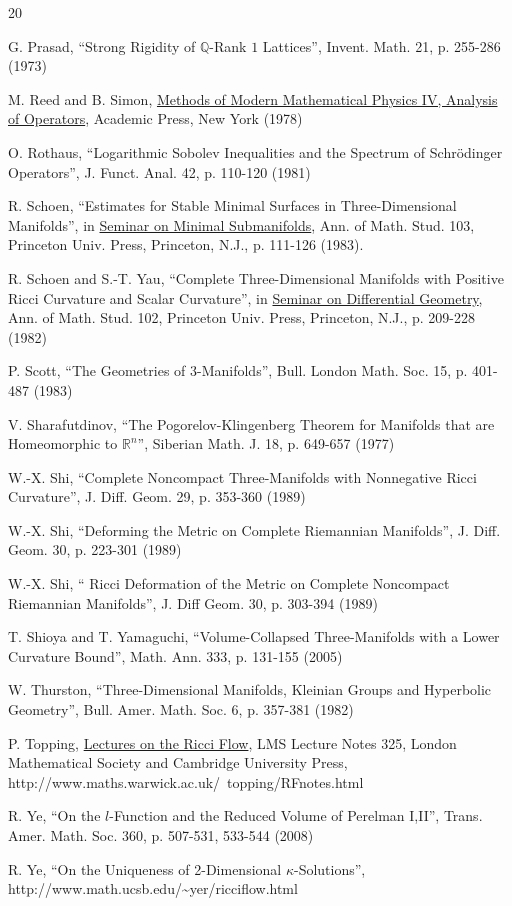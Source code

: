 \documentclass[12pt]{amsart}
\newcommand{\Q}{{\mathbb Q}}
\newcommand{\R}{{\mathbb R}}
\numberwithin{equation}{section}
\theoremstyle{plain}
\theoremstyle{definition}
\theoremstyle{remark}
\begin{document}
\begin{thebibliography}{20}
  
 G. Prasad, ``Strong Rigidity of $\Q$-Rank $1$ Lattices'',
Invent. Math. 21, p. 255-286 (1973)

 M. Reed and B. Simon, 
\underline{Methods of Modern Mathematical Physics IV, Analysis of 
Operators}, Academic Press, New York (1978)

 O. Rothaus,
``Logarithmic Sobolev Inequalities and the Spectrum of Schr\"odinger 
Operators'', J. Funct. Anal. 42, p. 110-120 (1981)

 R. Schoen,
``Estimates for Stable Minimal Surfaces in Three-Dimensional Manifolds'',
in \underline{Seminar on Minimal Submanifolds}, 
Ann. of Math. Stud. 103, Princeton Univ. Press, Princeton, N.J., p. 111-126 (1983).

R. Schoen and S.-T. Yau,
``Complete Three-Dimensional Manifolds with Positive Ricci Curvature
  and Scalar Curvature'', in
\underline{Seminar on Differential Geometry}, Ann. of
  Math. Stud. 102,  Princeton Univ. Press, Princeton, N.J., p.  209-228 (1982)

 P. Scott,
``The Geometries of $3$-Manifolds'',
Bull. London Math. Soc. 15, p. 401-487 (1983) 

 V. Sharafutdinov,
``The Pogorelov-Klingenberg Theorem for Manifolds that are Homeomorphic to 
$\R^n$'',
Siberian Math. J. 18, p. 649-657 (1977)

 W.-X. Shi, ``Complete Noncompact Three-Manifolds
with Nonnegative Ricci Curvature'',
J. Diff. Geom. 29, p. 353-360 (1989)

 W.-X. Shi, ``Deforming the Metric on Complete 
Riemannian Manifolds'',
J. Diff. Geom. 30, p. 223-301 (1989)

 W.-X. Shi, `` Ricci Deformation of the Metric on 
Complete Noncompact Riemannian Manifolds'',
J. Diff Geom. 30, p. 303-394 (1989)

 T. Shioya and T. Yamaguchi,
``Volume-Collapsed Three-Manifolds with a Lower Curvature Bound'',
Math. Ann. 333, p. 131-155 (2005)

 W. Thurston,
``Three-Dimensional Manifolds, Kleinian Groups and Hyperbolic Geometry'',
Bull. Amer. Math. Soc. 6, p. 357-381 (1982)

 P. Topping, \underline{Lectures on the Ricci Flow},
LMS Lecture Notes 325, London Mathematical Society and Cambridge University
Press, 
http://www.maths.warwick.ac.uk/~topping/RFnotes.html
 
 R. Ye, ``On the $l$-Function and the Reduced Volume of
Perelman I,II'', Trans. Amer. Math. Soc. 360, p. 507-531, 533-544 (2008) 

 R. Ye, ``On the Uniqueness of 2-Dimensional
$\kappa$-Solutions'',
http://www.math.ucsb.edu/\~{}yer/ricciflow.html
\end{thebibliography}
\end{document}
